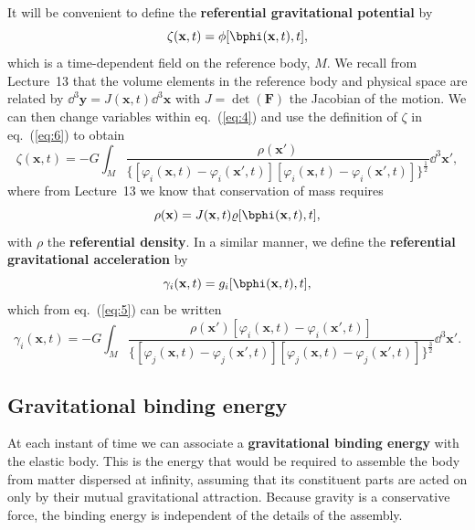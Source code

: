 It will be convenient to define the \textbf{referential gravitational potential} by
\begin{equation}
\zeta(\mathbf{x},t)=\phi[\bphi(\mathbf{x},t),t],
\label{eq:6}
\end{equation}
which is a time-dependent field on the reference body, $M$. We recall from Lecture~13 that the volume elements in 
the reference body and physical space are related by $\dd^{3}\mathbf{y} = J(\mathbf{x},t)\dd^{3}\mathbf{x}$ with $J=\det(\mathbf{F})$ 
the Jacobian of the motion. We can then change variables within eq.~(\ref{eq:4}) and use the definition of $\zeta$ in eq.~(\ref{eq:6}) to obtain
\begin{equation}
\zeta(\mathbf{x},t)=-G\int_{M}\frac{\rho(\mathbf{x}')}{\{[\varphi_{i}(\mathbf{x},t)-\varphi_{i}(\mathbf{x}',t)]
[\varphi_{i}(\mathbf{x},t)-\varphi_{i}(\mathbf{x}',t)]\}^{\frac{1}{2}}}\dd^{3}\mathbf{x}',
\label{eq:7}
\end{equation}
where from Lecture~13 we know that conservation of mass requires
\begin{equation}
\rho(\mathbf{x})=J(\mathbf{x},t)\varrho[\bphi(\mathbf{x},t),t],
\label{eq:8}
\end{equation}
with $\rho$ the \textbf{referential density}. In a similar manner, we define the \textbf{referential gravitational acceleration} by
\begin{equation}
\gamma_{i}(\mathbf{x},t)=g_{i}[\bphi(\mathbf{x},t),t],
\label{eq:9}
\end{equation}
which from eq.~(\ref{eq:5}) can be written
\begin{equation}
\gamma_{i}(\mathbf{x},t)=-G\int_{M}\frac{\rho(\mathbf{x}')[\varphi_{i}(\mathbf{x},t)-\varphi_{i}(\mathbf{x}',t)]}
{\{[\varphi_{j}(\mathbf{x},t)-\varphi_{j}(\mathbf{x}',t)][\varphi_{j}(\mathbf{x},t)-\varphi_{j}(\mathbf{x}',t)]\}^{\frac{3}{2}}}\dd^{3}\mathbf{x}'.
\label{eq:10}
\end{equation}

\subsection*{Gravitational binding energy}

At each instant of time we can associate a \textbf{gravitational binding energy} with the elastic body. This is the energy 
that would be required to assemble the body from matter dispersed at infinity, assuming that its constituent parts 
are acted on only by their mutual gravitational attraction. Because gravity is a conservative force, the binding 
energy is independent of the details of the assembly. 

